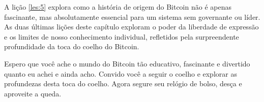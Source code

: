 A lição \ref{les:5} explora como a história de origem do Bitcoin não é apenas fascinante, mas absolutamente essencial para um sistema sem governante ou líder. As duas últimas lições deste capítulo exploram o poder da liberdade de expressão e os limites de nosso conhecimento individual, refletidos pela surpreendente profundidade da toca do coelho do Bitcoin.

Espero que você ache o mundo do Bitcoin tão educativo, fascinante e divertido quanto eu achei e ainda acho. Convido você a seguir o coelho e explorar as profundezas desta toca do coelho. Agora segure seu relógio de bolso, desça e aproveite a queda.